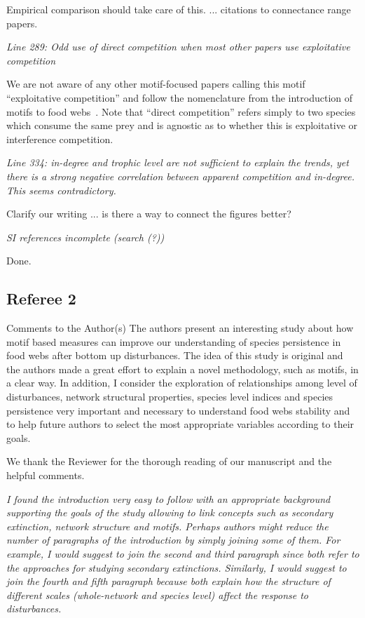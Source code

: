 \documentclass[12pt]{article}
\newcommand{\us}{\rm \setlength{\leftskip}{0.3cm} \setlength{\rightskip}{0.3cm}}
\newcommand{\them}{\it \setlength{\leftskip}{0cm} \setlength{\rightskip}{0cm}}
\begin{document}
\us Empirical comparison should take care of this. ... citations to connectance range papers.

\them
Line 289: Odd use of direct competition when most other papers use exploitative competition

\us We are not aware of any other motif-focused papers calling this motif ``exploitative competition'' and follow the nomenclature from the introduction of motifs to food webs~\citep{Stouffer2007}.
Note that ``direct competition'' refers simply to two species which consume the same prey and is agnostic as to whether this is exploitative or interference competition.


\them
Line 334: in-degree and trophic level are not sufficient to explain the trends, yet there is a strong negative correlation between apparent competition and in-degree. This seems contradictory.

\us Clarify our writing ... is there a way to connect the figures better?

\them
SI references incomplete (search (?))

\us
Done.

\subsection*{Referee 2}


Comments to the Author(s)
The authors present an interesting study about how motif based measures can improve our understanding of species persistence in food webs after bottom up disturbances. The idea of this study is original and the authors made a great effort to explain a novel methodology, such as motifs, in a clear way. In addition, I consider the exploration of relationships among level of disturbances, network structural properties, species level indices and species persistence very important and necessary to understand food webs stability and to help future authors to select the most appropriate variables according to their goals.

\us
We thank the Reviewer for the thorough reading of our manuscript and the helpful comments. 

\them
I found the introduction very easy to follow with an appropriate background supporting the goals of the study allowing to link concepts such as secondary extinction, network structure and motifs. Perhaps authors might reduce the number of paragraphs of the introduction by simply joining some of them. For example, I would suggest to join the second and third paragraph since both refer to the approaches for studying secondary extinctions. Similarly, I would suggest to join the fourth and fifth paragraph because both explain how the structure of different scales (whole-network and species level) affect the response to disturbances.
\end{document}
